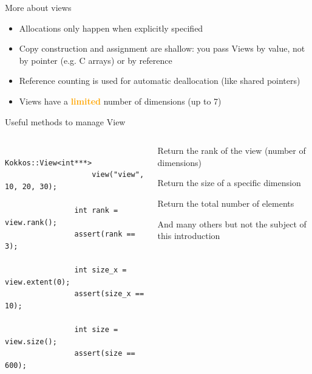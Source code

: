 \documentclass[aspectratio=169]{beamer}
\newcommand{\highlight}[1]{\textcolor{orange}{\textbf{#1}}}
\begin{document}

\begin{frame}{More about views}
    \begin{itemize}
        \item Allocations only happen when explicitly specified
        \item Copy construction and assignment are shallow: you pass Views by value, not by pointer (e.g. C arrays) or by reference
        \item Reference counting is used for automatic deallocation (like shared pointers)
        \item Views have a \highlight{limited} number of dimensions (up to 7)
    \end{itemize}
\end{frame}


\begin{frame}[fragile]{Useful methods to manage View}
    \begin{columns}
        \begin{column}{0.5\linewidth}
            \begin{verbatim}
                Kokkos::View<int***>
                    view("view", 10, 20, 30);

                int rank = view.rank();
                assert(rank == 3);

                int size_x = view.extent(0);
                assert(size_x == 10);

                int size = view.size();
                assert(size == 600);
            \end{verbatim}
        \end{column}
        \begin{column}{0.5\linewidth}
            \begin{description}
                \item[\texttt{rank()}] Return the rank of the view (number of dimensions)
                \item[\texttt{extent(dim)}] Return the size of a specific dimension
                \item[\texttt{size()}] Return the total number of elements
            \end{description}

            And many others but not the subject of this introduction
        \end{column}
    \end{columns}
\end{frame}
\end{document}
